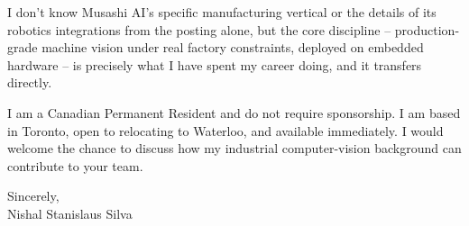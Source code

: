 \documentclass[11pt]{article}
\begin{document}
\noindent I don't know Musashi AI's specific manufacturing vertical or the details of its robotics integrations from the posting alone, but the core discipline -- production-grade machine vision under real factory constraints, deployed on embedded hardware -- is precisely what I have spent my career doing, and it transfers directly.

\vspace{1em}

\noindent I am a Canadian Permanent Resident and do not require sponsorship. I am based in Toronto, open to relocating to Waterloo, and available immediately. I would welcome the chance to discuss how my industrial computer-vision background can contribute to your team.

\vspace{1.5em}

\noindent Sincerely, \\
Nishal Stanislaus Silva
\end{document}
